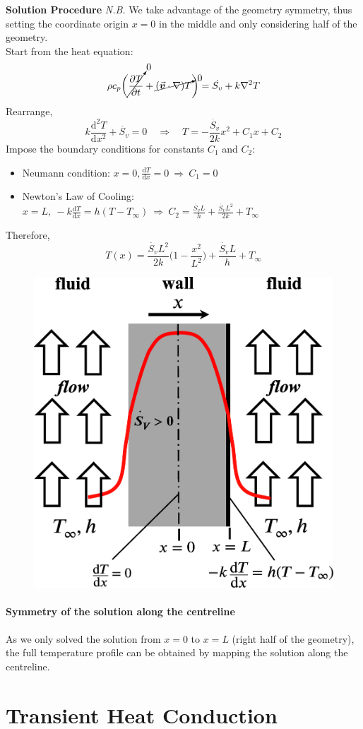 \documentclass[12pt, a4paper]{article}
\numberwithin{equation}{subsection}
\begin{document}
\begin{tcolorbox}[breakable, title = \textbf{Example: Internal Heat Generation}]
\textbf{Solution Procedure} \quad 
\emph{N.B.} We take advantage of the geometry symmetry, thus setting the coordinate origin $x=0$ in the middle and only considering half of the geometry. \\
Start from the heat equation:
\[ 
    \rho c_{p} \bigg( \cancelto{0}{\frac{\partial T}{\partial t}} +\cancelto{0}{(\vec{\bm{v}} \cdot \nabla) T} \bigg) = \dot{S_{v}}  +k \nabla^{2} T 
\]
Rearrange,
\[ 
    k \frac{\mathrm{d}^{2} T}{\mathrm{d}x^{2}} + \dot{S_{v}}=0 \quad \Rightarrow \quad T = -\frac{\dot{S_{v}}}{2k}x^{2}+C_{1}x + C_{2}
\]
Impose the boundary conditions for constants $C_1$ and $C_2$:
\begin{itemize}
    \item Neumann condition: $\displaystyle x=0, \frac{\mathrm{d}T}{\mathrm{d}x}=0 \ \Rightarrow \  C_{1}=0$
    \item Newton's Law of Cooling: $\displaystyle x=L, \ -k\frac{\mathrm{d}T}{\mathrm{d}x}=h(T-T_{\infty}) \ \Rightarrow \ C_{2}=\frac{\dot{S_{v}}L}{h}+\frac{\dot{S_{v}}L^{2}}{2k}+T_{\infty}$ 
\end{itemize}
Therefore,
\[
    T(x) = \frac{\dot{S_{v}}L^{2}}{2k} \bigg( 1-\frac{x^{2}}{L^{2}} \bigg) + \frac{\dot{S_{v}}L}{h} + T_{\infty} 
\]
\begin{figure}[H]
    \centering
    \includegraphics[width=.4\textwidth]{img/internal_heat_gen_solution.eps}
\end{figure}
\paragraph{Symmetry of the solution along the centreline} As we only solved the solution from $x=0$ to $x=L$ (right half of the geometry), the full temperature profile can be obtained by mapping the solution along the centreline.
\end{tcolorbox}

\newpage
\section{Transient Heat Conduction}
\end{document}
